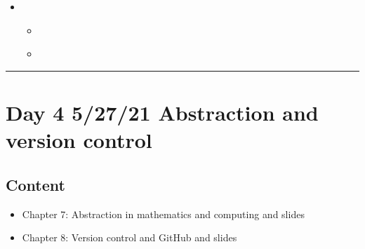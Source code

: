 \documentclass[letterpaper,10pt,english]{jupyterBook}
\begin{document}
\begin{itemize}
\item {} 
\sphinxAtStartPar
{}
\begin{itemize}
\item {} 
\sphinxAtStartPar
{\hyperref[\detokenize{chapter-7-abstraction::doc}]{}}

\item {} 
\sphinxAtStartPar
{\hyperref[\detokenize{chapter-8-version-control::doc}]{}}

\end{itemize}

\end{itemize}


\bigskip\hrule\bigskip



\section{Day 4 \sphinxhyphen{} 5/27/21 \sphinxhyphen{} Abstraction and version control}
\label{\detokenize{course-schedule:day-4-5-27-21-abstraction-and-version-control}}

\subsection{Content}
\label{\detokenize{course-schedule:id5}}\begin{itemize}
\item {} 
\sphinxAtStartPar
Chapter 7: Abstraction in mathematics and computing \sphinxhyphen{} {\hyperref[\detokenize{chapter-7-abstraction::doc}]{}} and slides

\item {} 
\sphinxAtStartPar
Chapter 8: Version control and GitHub \sphinxhyphen{} {\hyperref[\detokenize{chapter-8-version-control::doc}]{}} and slides

\end{itemize}
\end{document}
